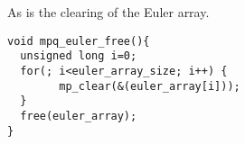\documentclass[10pt]{book}
\theoremstyle{definition}
\theoremstyle{remark}
\begin{document}
As is the clearing of the Euler array.
 \begin{center}
    \begin{lstlisting}[caption={Free Euler Number Array},label=freeeulerarr]
void mpq_euler_free(){
  unsigned long i=0;
  for(; i<euler_array_size; i++) {
        mp_clear(&(euler_array[i]));
  }
  free(euler_array);
}
    \end{lstlisting}
  \end{center}
 


\lstlistoflistings


\end{document}
